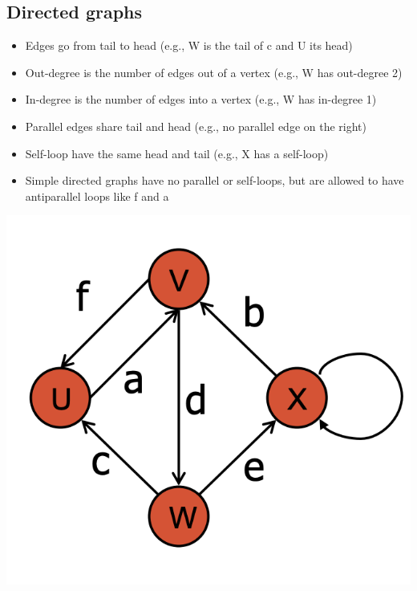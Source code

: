\documentclass[12pt]{article}
\newcommand{\1}{\space \quad}
\newcommand{\2}{\quad \quad \quad}
\newcommand{\3}{\quad \quad \quad \quad \space}
\newcommand{\4}{\quad \quad \quad \quad \quad \quad}
\newcommand{\5}{\quad \quad \quad \quad \quad \quad \quad \space}
\begin{document}
\subsection{Directed graphs}
\begin{minipage}[l]{0.6\textwidth}
  \begin{itemize}
    \item Edges go from tail to head (e.g., W is the tail of c and U its head)
    \item Out-degree is the number of edges out of a vertex (e.g., W has out-degree 2)
    \item In-degree is the number of edges into a vertex (e.g., W has in-degree 1)
    \item Parallel edges share tail and head (e.g., no parallel edge on the right)
    \item Self-loop have the same head and tail (e.g., X has a self-loop)
    \item Simple directed graphs have no parallel or self-loops, but are allowed to have antiparallel loops like f and a
  \end{itemize}
\end{minipage}
\begin{minipage}[r]{0.39\textwidth}
  \raggedleft
  \includegraphics[width=\textwidth]{image17.png}
\end{minipage}

\end{document}
